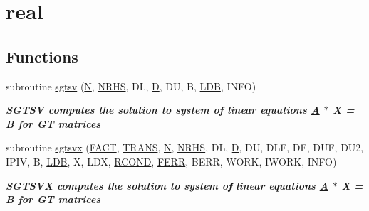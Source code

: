 \hypertarget{group__realGTsolve}{}\section{real}
\label{group__realGTsolve}
\subsection*{Functions}
\begin{DoxyCompactItemize}
\item 
subroutine \hyperlink{group__realGTsolve_gae1cbb7cd9c376c9cc72575d472eba346}{sgtsv} (\hyperlink{polmisc_8c_a0240ac851181b84ac374872dc5434ee4}{N}, \hyperlink{example__user_8c_aa0138da002ce2a90360df2f521eb3198}{N\+R\+H\+S}, D\+L, \hyperlink{odrpack_8h_a7dae6ea403d00f3687f24a874e67d139}{D}, D\+U, B, \hyperlink{example__user_8c_a50e90a7104df172b5a89a06c47fcca04}{L\+D\+B}, I\+N\+F\+O)
\begin{DoxyCompactList}\small\item\em {\bfseries  S\+G\+T\+S\+V computes the solution to system of linear equations \hyperlink{classA}{A} $\ast$ X = B for G\+T matrices {\bfseries  }}\end{DoxyCompactList}\item 
subroutine \hyperlink{group__realGTsolve_ga84bd4bb6dda1f7d553d8bb78ce48cf7b}{sgtsvx} (\hyperlink{superlu__enum__consts_8h_af00a42ecad444bbda75cde1b64bd7e72a1b6692b56d378abb85bd49063721d034}{F\+A\+C\+T}, \hyperlink{superlu__enum__consts_8h_a0c4e17b2d5cea33f9991ccc6a6678d62a1f61e3015bfe0f0c2c3fda4c5a0cdf58}{T\+R\+A\+N\+S}, \hyperlink{polmisc_8c_a0240ac851181b84ac374872dc5434ee4}{N}, \hyperlink{example__user_8c_aa0138da002ce2a90360df2f521eb3198}{N\+R\+H\+S}, D\+L, \hyperlink{odrpack_8h_a7dae6ea403d00f3687f24a874e67d139}{D}, D\+U, D\+L\+F, D\+F, D\+U\+F, D\+U2, I\+P\+I\+V, B, \hyperlink{example__user_8c_a50e90a7104df172b5a89a06c47fcca04}{L\+D\+B}, X, L\+D\+X, \hyperlink{superlu__enum__consts_8h_af00a42ecad444bbda75cde1b64bd7e72a9b5c151728d8512307565994c89919d5}{R\+C\+O\+N\+D}, \hyperlink{superlu__enum__consts_8h_af00a42ecad444bbda75cde1b64bd7e72a78fd14d7abebae04095cfbe02928f153}{F\+E\+R\+R}, B\+E\+R\+R, W\+O\+R\+K, I\+W\+O\+R\+K, I\+N\+F\+O)
\begin{DoxyCompactList}\small\item\em {\bfseries  S\+G\+T\+S\+V\+X computes the solution to system of linear equations \hyperlink{classA}{A} $\ast$ X = B for G\+T matrices {\bfseries  }}\end{DoxyCompactList}\end{DoxyCompactItemize}


